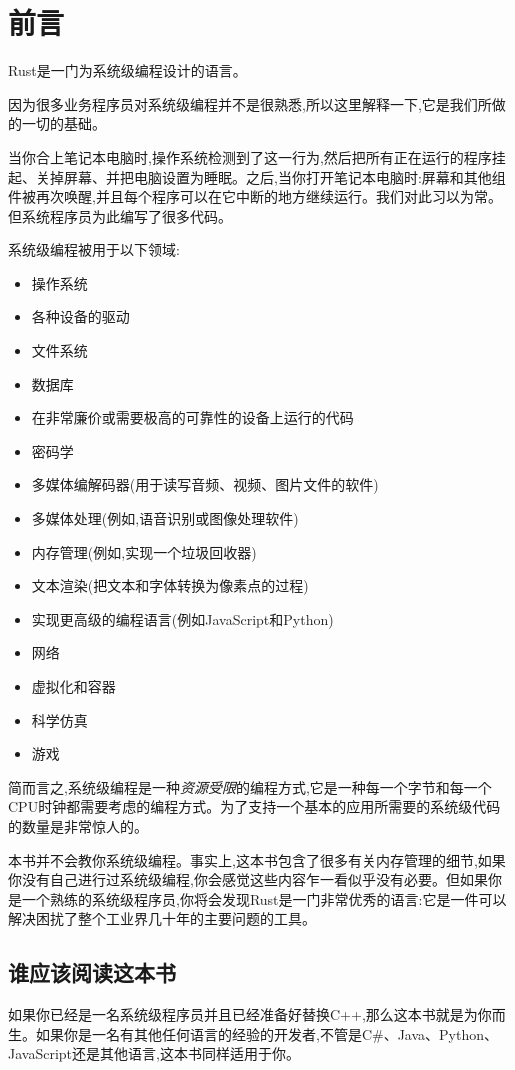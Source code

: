 \chapter{前言}
Rust是一门为系统级编程设计的语言。

因为很多业务程序员对系统级编程并不是很熟悉,所以这里解释一下,它是我们所做的一切的基础。

当你合上笔记本电脑时,操作系统检测到了这一行为,然后把所有正在运行的程序挂起、关掉屏幕、并把电脑设置为睡眠。之后,当你打开笔记本电脑时:屏幕和其他组件被再次唤醒,并且每个程序可以在它中断的地方继续运行。我们对此习以为常。但系统程序员为此编写了很多代码。

系统级编程被用于以下领域:
\begin{itemize}
    \item 操作系统
    \item 各种设备的驱动
    \item 文件系统
    \item 数据库
    \item 在非常廉价或需要极高的可靠性的设备上运行的代码
    \item 密码学
    \item 多媒体编解码器(用于读写音频、视频、图片文件的软件)
    \item 多媒体处理(例如,语音识别或图像处理软件)
    \item 内存管理(例如,实现一个垃圾回收器)
    \item 文本渲染(把文本和字体转换为像素点的过程)
    \item 实现更高级的编程语言(例如JavaScript和Python)
    \item 网络
    \item 虚拟化和容器
    \item 科学仿真
    \item 游戏
\end{itemize}

简而言之,系统级编程是一种\emph{资源受限}的编程方式,它是一种每一个字节和每一个CPU时钟都需要考虑的编程方式。为了支持一个基本的应用所需要的系统级代码的数量是非常惊人的。

本书并不会教你系统级编程。事实上,这本书包含了很多有关内存管理的细节,如果你没有自己进行过系统级编程,你会感觉这些内容乍一看似乎没有必要。但如果你是一个熟练的系统级程序员,你将会发现Rust是一门非常优秀的语言:它是一件可以解决困扰了整个工业界几十年的主要问题的工具。

\section*{谁应该阅读这本书}
如果你已经是一名系统级程序员并且已经准备好替换C++,那么这本书就是为你而生。如果你是一名有其他任何语言的经验的开发者,不管是C\#、Java、Python、JavaScript还是其他语言,这本书同样适用于你。


